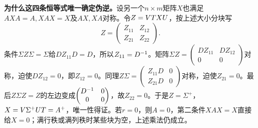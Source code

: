\textbf{为什么这四条恒等式唯一确定伪逆。}设另一个$n\times m$矩阵$X$也满足$AXA=A,XAX=X$及$AX,XA$对称。令$Z=VT XU$，按上述大小分块写
\[
Z=\begin{pmatrix}Z_{11}&Z_{12}\\Z_{21}&Z_{22}\end{pmatrix}.
\]
条件$\Sigma Z\Sigma=\Sigma$给$DZ_{11}D=D$，所以$Z_{11}=D^{-1}$。矩阵$\Sigma Z=\begin{pmatrix}DZ_{11}&DZ_{12}\\0&0\end{pmatrix}$对称，迫使$DZ_{12}=0$，即$Z_{12}=0$。同理$Z\Sigma=\begin{pmatrix}Z_{11}D&0\\Z_{21}D&0\end{pmatrix}$对称，迫使$Z_{21}=0$。最后$Z\Sigma Z=Z$的左边变成$\begin{pmatrix}D^{-1}&0\\0&0\end{pmatrix}$，故$Z_{22}=0$。于是$Z=\Sigma^+$，$X=V\Sigma^+UT=A^+$，唯一性得证。若$r=0$，则$A=0$，第二条件$XAX=X$直接给$X=0$；满行秩或满列秩时某些块为空，上述乘法仍成立。

